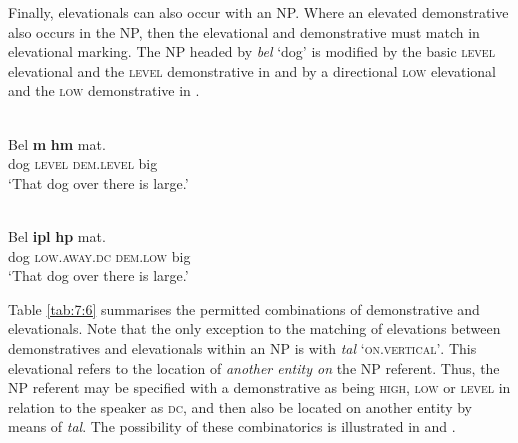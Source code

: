 Finally, elevationals can also occur with an NP. Where an elevated demonstrative also occurs in the NP, then the elevational and demonstrative must match in elevational marking. The NP headed by \textit{bel} `dog' is modified by the basic \textsc{level} elevational and the \textsc{level} demonstrative in  and by a directional \textsc{low} elevational and the \textsc{low} demonstrative in .  



\ea%
\label{ex:7:26}
 \\
\gll Bel  \textbf{m{\textopeno}{\ng}}  \textbf{h{\textepsilon}m{\textopeno}} mat{\textepsilon}.  \\
  dog  \textsc{level} \textsc{dem.level} big      \\
\glt   `That dog over there is large.'
\z

 
 





\ea%
\label{ex:7:27}
 \\
\gll   Bel  \textbf{ipl{\textepsilon}} \textbf{h{\textepsilon}p{\textopeno}} mat{\textepsilon}. \\
    dog  \textsc{low.away.dc} \textsc{dem.low} big    \\
\glt   `That dog over there is large.'
\z



   



{Table \ref{tab:7:6} summarises the permitted combinations of demonstrative and elevationals. Note that the only exception to the matching of elevations between demonstratives and elevationals within an NP is with} \textit{tal}\textit{{\textepsilon}} `\textsc{on.vertical'}. This elevational refers to the location of \textit{another entity on} the NP referent. Thus, the NP referent may be specified with a demonstrative as being \textsc{high}, \textsc{low} or \textsc{level} in relation to the speaker as \textsc{dc}, and then also be located on another entity by means of \textit{tal}\textit{{\textepsilon}}. The possibility of these combinatorics is illustrated in  and .

